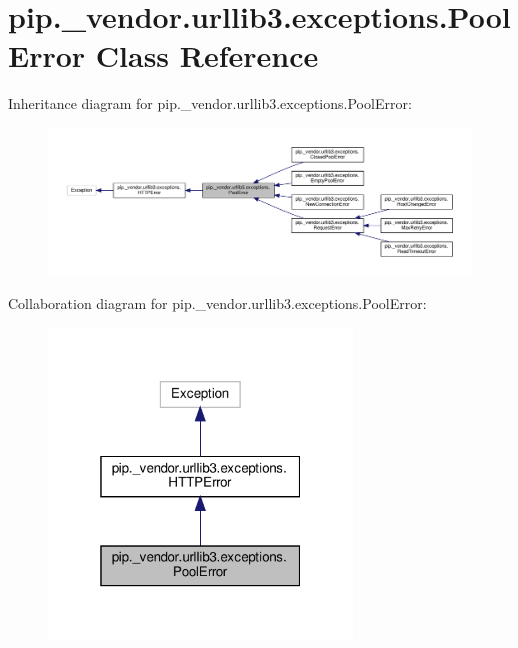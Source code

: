 \hypertarget{classpip_1_1__vendor_1_1urllib3_1_1exceptions_1_1PoolError}{}\section{pip.\+\_\+vendor.\+urllib3.\+exceptions.\+Pool\+Error Class Reference}
\label{classpip_1_1__vendor_1_1urllib3_1_1exceptions_1_1PoolError}


Inheritance diagram for pip.\+\_\+vendor.\+urllib3.\+exceptions.\+Pool\+Error\+:
\nopagebreak
\begin{figure}[H]
\begin{center}
\leavevmode
\includegraphics[width=350pt]{classpip_1_1__vendor_1_1urllib3_1_1exceptions_1_1PoolError__inherit__graph}
\end{center}
\end{figure}


Collaboration diagram for pip.\+\_\+vendor.\+urllib3.\+exceptions.\+Pool\+Error\+:
\nopagebreak
\begin{figure}[H]
\begin{center}
\leavevmode
\includegraphics[width=229pt]{classpip_1_1__vendor_1_1urllib3_1_1exceptions_1_1PoolError__coll__graph}
\end{center}
\end{figure}

